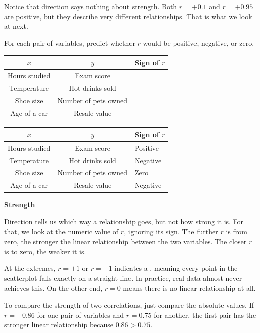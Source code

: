 Notice that direction says nothing about strength. Both $r = +0.1$
and $r = +0.95$ are positive, but they describe very different
relationships. That is what we look at next.

\begin{Exercise}[title={Reading Direction from $r$}, label={ex:direction}]
For each pair of variables, predict whether $r$ would be positive,
negative, or zero.

\begin{tabular}{|c|c|p{4cm}|}
\hline
$x$ & $y$ & Sign of $r$ \\
\hline
Hours studied & Exam score & \\
\hline
Temperature & Hot drinks sold & \\
\hline
Shoe size & Number of pets owned & \\
\hline
Age of a car & Resale value & \\
\hline
\end{tabular}
\end{Exercise}

\begin{Answer}[ref={ex:direction}]
\begin{tabular}{|c|c|p{4cm}|}
\hline
$x$ & $y$ & Sign of $r$ \\
\hline
Hours studied & Exam score & Positive \\
\hline
Temperature & Hot drinks sold & Negative \\
\hline
Shoe size & Number of pets owned & Zero \\
\hline
Age of a car & Resale value & Negative \\
\hline
\end{tabular}
\end{Answer}

\textbf{Strength}

Direction tells us which way a relationship goes, but not how strong
it is. For that, we look at the numeric value of $r$, ignoring its
sign. The further $r$ is from zero, the stronger the linear
relationship between the two variables. The closer $r$ is to zero,
the weaker it is.

At the extremes, $r = +1$ or $r = -1$ indicates a , meaning every point in the
scatterplot falls exactly on a straight line. In practice, real data
almost never achieves this. On the other end, $r = 0$ means there is
no linear relationship at all.

To compare the strength of two correlations, just compare the absolute
values. If $r = -0.86$ for one pair of variables and $r = 0.75$ for
another, the first pair has the stronger linear relationship because
$0.86 > 0.75$.

